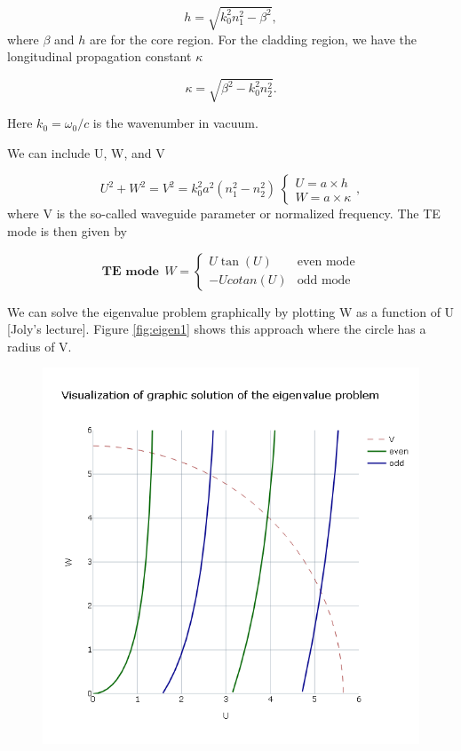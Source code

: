             \begin{equation}
                h=\sqrt{k_0^2n_1^2-\beta^2},
                \label{eq_h}
            \end{equation}
 where $\beta$ and $h$ are for the core region. For the cladding region, we have the longitudinal propagation constant $\kappa$

             \begin{equation}
                \kappa=\sqrt{\beta^2-k_0^2n_2^2}.
                \label{gam}
            \end{equation}
 
 Here $k_0 = \omega_0/c$ is the wavenumber in vacuum.



We can include U, W, and V

            \begin{equation}
                U^2+W^2 = V^2 = k_0^2a^2(n_1^2-n_2^2) \
                \begin{cases}
                    U = a \times h \\
                    W = a \times \kappa
                \end{cases} 
                \label{Normv},
            \end{equation}
where V is the so-called waveguide parameter or normalized frequency. 
The TE mode is then given by 
         
            
            \begin{equation}
            \textbf{TE mode} \ \ W=
                \begin{cases}
                    U \tan(U) & \text{even mode}\\
                    -U cotan(U) & \text{odd mode}
                \end{cases}
                \label{Temode}
            \end{equation}

We can solve the eigenvalue problem graphically by plotting W as a function of U [Joly's lecture]. Figure \ref{fig:eigen1} shows this approach where the circle has a radius of V.


\begin{figure}[label={fig:eigen1}, caption={Visualization of the graphic solution of the eigenvalue problem. Taken from \cite{herokuapp}}]
	\includegraphics[width=.6\textwidth]{figures/chap2/Eigenvalue.png} 
\end{figure}


